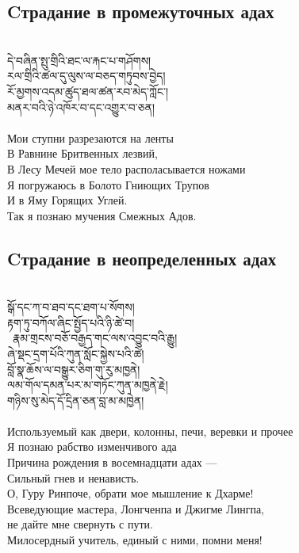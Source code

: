 \newpage
\subsection*{Cтрадание в промежуточных адах}
\\
\ti
དེ་བཞིན་སྤུ་གྲིའི་ཐང་ལ་རྐང་པ་གཤོགས།\\
རལ་གྲིའི་ཚལ་དུ་ལུས་ལ་བཅད་གཏུབས་བྱེད།\\
རོ་མྱགས་འདམ་ཚུད་ཐལ་ཚན་རབ་མེད་ཀློང་། \\
མནར་བའི་ཉེ་འཁོར་བ་དང་འགྱུར་བ་ཅན།\\
\\
\ru
Мои ступни разрезаются на ленты\\
В Равнине Бритвенных лезвий,\\
В Лесу Мечей мое тело располасывается ножами\\
Я погружаюсь в Болото Гниющих Трупов\\
И в Яму Горящих Углей.\\
Так я познаю мучения Смежных Адов.

\subsection*{Cтрадание в неопределенных адах}
\\
\ti
སྒོ་དང་ཀ་བ་ཐབ་དང་ཐག་པ་སོགས།\\
རྟག་ཏུ་བཀོལ་ཞིང་སྤྱོད་པའི་ཉི་ཚེ་བ། \\\
རྣམ་གྲངས་བཅོ་བརྒྱད་གང་ལས་འབྱུང་བའི་རྒྱུ། \\
ཞེ་སྡང་དྲག་པོའི་ཀུན་སློང་སྐྱེས་པའི་ཚེ། \\
བློ་སྣ་ཆོས་ལ་བསྒྱུར་ཅིག་གུ་རུ་མཁྱནེ། \\
ལམ་གོལ་དམན་པར་མ་གཏོང་ཀུན་མཁྱནེ་རྗེ། \\
གཉིས་སུ་མེད་དོ་དྲིན་ཅན་བླ་མ་མཁྱེན།\\
\\
\ru
Используемый как двери, колонны, печи, веревки и прочее\\
Я познаю рабство изменчивого ада\\
Причина рождения в восем\-надцати адах —\\
Сильный гнев и ненависть.\\
О, Гуру Ринпоче, обрати мое мышление к Дхарме!\\
Всеведующие мастера, Лонг\-ченпа и Джигме Лингпа,\\
не дайте мне свернуть с пути.\\
Милосердный учитель, единый с ними, помни меня!
\\

